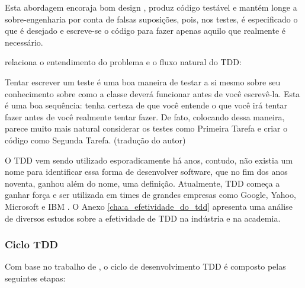 Esta abordagem encoraja bom design \cite{GrowingOOByTests}, produz código testável e mantém longe a sobre-engenharia por conta de falsas suposições, pois, nos testes, é especificado o que é desejado e escreve-se o código para fazer apenas aquilo que realmente é necessário. \cite{TestDrivenKoskela, TDDbyExample, EmpiricalTDD}

 relaciona o entendimento do problema e o fluxo natural do TDD:

\begin{citacao}
Tentar escrever um teste é uma boa maneira de testar a si mesmo sobre seu conhecimento sobre como a classe deverá funcionar antes de você escrevê-la. Esta é uma boa sequência: tenha certeza de que você entende o que você irá tentar fazer antes de você realmente tentar fazer. De fato, colocando dessa maneira, parece muito mais natural considerar os testes como Primeira Tarefa e criar o código como Segunda Tarefa. (tradução do autor)
\end{citacao}

O TDD vem sendo utilizado esporadicamente há anos, contudo, não existia um nome para identificar essa forma de desenvolver software, que no fim dos anos noventa, ganhou além do nome, uma definição. Atualmente, TDD começa a ganhar força e ser utilizada em times de grandes empresas como Google, Yahoo, Microsoft e IBM \cite{EmpiricalTDD}. O Anexo \ref{cha:a_efetividade_do_tdd} apresenta uma análise de diversos estudos sobre a efetividade de TDD na indústria e na academia.

\subsubsection{Ciclo TDD}
\label{ssub:ciclo_tdd}

Com base no trabalho de , o ciclo de desenvolvimento TDD é composto pelas seguintes etapas:

